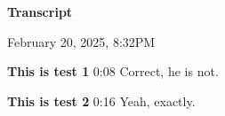 \documentclass[11pt,a4paper]{article}
\begin{document}
\textbf{Transcript}

February 20, 2025, 8:32PM

\begin{figure}[h]
\end{figure}

\begin{figure}[h]
\end{figure}

\textbf{This is test 1}   0:08
Correct, he is not.

\begin{figure}[h]
\end{figure}

\textbf{This is test 2} 0:16
Yeah, exactly.
\end{document}
